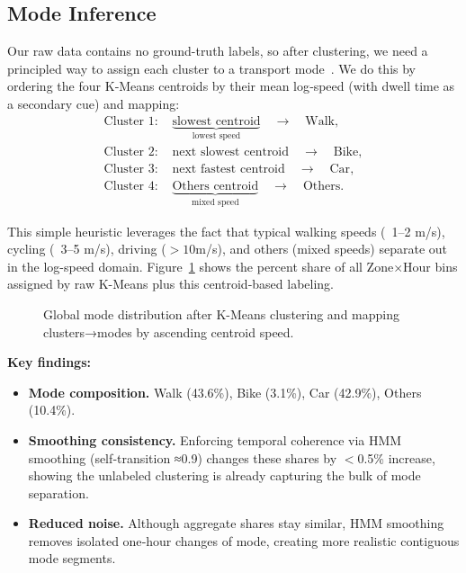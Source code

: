 \documentclass[fleqn,moreauthors,10pt]{ds_report}
\begin{document}
\subsection*{Mode Inference}

Our raw data contains no ground-truth labels, so after clustering, we need a principled way to assign each cluster to a transport mode~\cite{dutta2023transport}.
  We do this by ordering the four K‐Means centroids by their mean log‐speed (with dwell time as a secondary cue) and mapping:
\[
\begin{aligned}
  \text{Cluster 1: } &\underbrace{\text{slowest centroid}}_{\text{lowest speed}}
    \quad\longrightarrow\quad \text{Walk},\\
  \text{Cluster 2: } &\text{next slowest centroid}
    \quad\longrightarrow\quad \text{Bike},\\
  \text{Cluster 3: } &\text{next fastest centroid}
    \quad\longrightarrow\quad \text{Car},\\
  \text{Cluster 4: } &\underbrace{\text{Others centroid}}_{\text{mixed speed}}
    \quad\longrightarrow\quad \text{Others}.
\end{aligned}
\]

This simple heuristic leverages the fact that typical walking speeds (~1–2 m/s), cycling (~3–5 m/s), driving ($>10$m/s), and others (mixed speeds) separate out in the log-speed domain. Figure~\ref{fig:global_kmeans} shows the percent share of all Zone$\times$Hour bins assigned by raw K-Means plus this centroid‐based labeling.

\begin{figure}[ht]
  \centering
  
  \caption{Global mode distribution after K-Means clustering and mapping clusters→modes by ascending centroid speed.}
  \label{fig:global_kmeans}
\end{figure}

\vspace{1ex}
\noindent\textbf{Key findings:}
\begin{itemize}[nosep]
  \item \textbf{Mode composition.}  Walk (43.6\%), Bike (3.1\%), Car (42.9\%), Others (10.4\%).
  \item \textbf{Smoothing consistency.}  Enforcing temporal coherence via HMM smoothing (self‐transition ≈0.9) changes these shares by $<$0.5\% increase, showing the unlabeled clustering is already capturing the bulk of mode separation.  
  \item \textbf{Reduced noise.}  Although aggregate shares stay similar, HMM smoothing removes isolated one‐hour changes of mode, creating more realistic contiguous mode segments.
\end{itemize}
\end{document}
